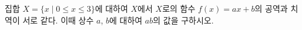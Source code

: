 \hspace*{2mm}\begin{minipage}[t]{\dimexpr\linewidth-2mm\relax}\vspace{0pt}
집합 $X=\{x\mid 0\le x\le 3\}$에 대하여 $X$에서 $X$로의 함수 $f(x)=ax+b$의 공역과 치역이 서로 같다. 이때 상수 $a$, $b$에 대하여 $ab$의 값을 구하시오. \end{minipage}
